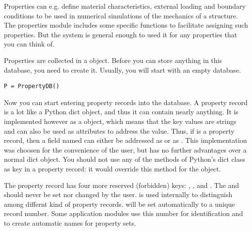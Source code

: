 Properties can e.g. define material characteristics, external loading and boundary conditions to be used in numerical simulations of the mechanics of a structure. The properties module includes some specific functions to facilitate assigning such properties. But the system is general enough to used it for any properties that you can think of.

Properties are collected in a  object. Before you can store anything in this database, you need to create it. Usually, you will start with an empty database.
\begin{verbatim}
P = PropertyDB()
\end{verbatim}

Now you can start entering property records into the database. A property record is a lot like a Python dict object, and thus it can contain nearly anything. It is implemented however as a  object, which means that the key values are strings and can also be used as attributes to address the value. Thus, if  is a property record, then a field named  can either be addressed as  or as . This implementation was choosen for the convenience of the user, but has no further advantages over a normal dict object. You should not use any of the methods of Python's dict class as key in a property record: it would override this method for the object.

The property record has four more reserved (forbidden) keys: , ,  and . The  and  should never be set nor changed by the user.  is used internally to distinguish among differnt kind of property records.  will be set automatically to a unique record number. Some application modules use this number for identification and to create automatic names for property sets. 

